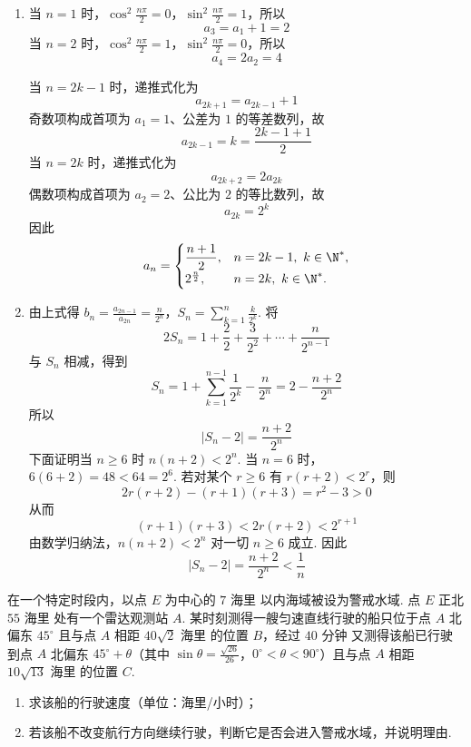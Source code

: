 \begin{solution}
\begin{enumerate}
\item 当 \(n=1\) 时，\(\cos^2\frac{n\pi}{2}=0\)，\(\sin^2\frac{n\pi}{2}=1\)，所以
\[
a_3=a_1+1=2
\]
当 \(n=2\) 时，\(\cos^2\frac{n\pi}{2}=1\)，\(\sin^2\frac{n\pi}{2}=0\)，所以
\[
a_4=2a_2=4
\]

当 \(n=2k-1\) 时，递推式化为
\[
a_{2k+1}=a_{2k-1}+1
\]
奇数项构成首项为 \(a_1=1\)、公差为 \(1\) 的等差数列，故
\[
a_{2k-1}=k=\frac{2k-1+1}{2}
\]
当 \(n=2k\) 时，递推式化为
\[
a_{2k+2}=2a_{2k}
\]
偶数项构成首项为 \(a_2=2\)、公比为 \(2\) 的等比数列，故
\[
a_{2k}=2^k
\]
因此
\[
a_n=
\begin{cases}
\dfrac{n+1}{2},&n=2k-1,\ k\in\N^{*},\\
2^{\frac{n}{2}},&n=2k,\ k\in\N^{*}.
\end{cases}
\]
\item 由上式得
\(b_n=\frac{a_{2n-1}}{a_{2n}}=\frac{n}{2^n}\)，\(S_n=\sum_{k=1}^{n}\frac{k}{2^k}\).
将
\[
2S_n=1+\frac2{2}+\frac3{2^2}+\cdots+\frac n{2^{n-1}}
\]
与 \(S_n\) 相减，得到
\[
S_n=1+\sum_{k=1}^{n-1}\frac1{2^k}-\frac n{2^n}
=2-\frac{n+2}{2^n}
\]
所以
\[
\lvert S_n-2\rvert=\frac{n+2}{2^n}
\]
下面证明当 \(n\geqslant6\) 时 \(n(n+2)<2^n\). 当 \(n=6\) 时，\(6(6+2)=48<64=2^6\). 若对某个 \(r\geqslant6\) 有 \(r(r+2)<2^r\)，则
\[
2r(r+2)-(r+1)(r+3)=r^2-3>0
\]
从而
\[
(r+1)(r+3)<2r(r+2)<2^{r+1}
\]
由数学归纳法，\(n(n+2)<2^n\) 对一切 \(n\geqslant6\) 成立. 因此
\[
\lvert S_n-2\rvert=\frac{n+2}{2^n}<\frac1n
\]
\end{enumerate}
\end{solution}

\begin{problem}
在一个特定时段内，以点 \(E\) 为中心的 \(7\text{ 海里}\) 以内海域被设为警戒水域. 点 \(E\) 正北 \(55\text{ 海里}\) 处有一个雷达观测站 \(A\). 某时刻测得一艘匀速直线行驶的船只位于点 \(A\) 北偏东 \(45^{\circ}\) 且与点 \(A\) 相距 \(40\sqrt{2}\text{ 海里}\) 的位置 \(B\)，经过 \(40\text{ 分钟}\) 又测得该船已行驶到点 \(A\) 北偏东 \(45^{\circ} + \theta\)（其中 \(\sin \theta = \frac{\sqrt{26}}{26}\)，\(0^{\circ} < \theta < 90^{\circ}\)）且与点 \(A\) 相距 \(10\sqrt{13}\text{ 海里}\) 的位置 \(C\).
\begin{enumerate}
\item 求该船的行驶速度（单位：海里/小时）；
\item 若该船不改变航行方向继续行驶，判断它是否会进入警戒水域，并说明理由.
\end{enumerate}
\end{problem}

